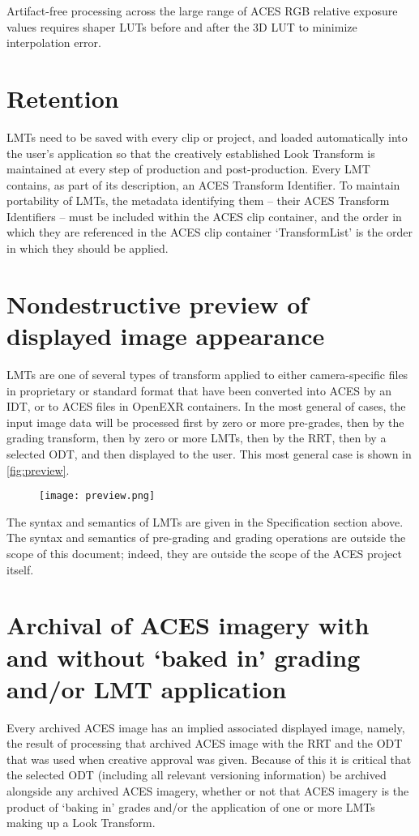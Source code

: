 Artifact-free processing across the large range of ACES RGB relative exposure values requires shaper LUTs before and after the 3D LUT to minimize interpolation error.

\section{Retention}
LMTs need to be saved with every clip or project, and loaded automatically into the user's application so that the creatively established Look Transform is maintained at every step of production and post-production. Every LMT contains, as part of its description, an ACES Transform Identifier. To maintain portability of LMTs, the metadata identifying them -- their ACES Transform Identifiers -- must be included within the ACES clip container, and the order in which they are referenced in the ACES clip container `TransformList' is the order in which they should be applied.

\section{Nondestructive preview of displayed image appearance}
LMTs are one of several types of transform applied to either camera-specific files in proprietary or standard format that have been converted into ACES by an IDT, or to ACES files in OpenEXR containers. In the most general of cases, the input image data will be processed first by zero or more pre-grades, then by the grading transform, then by zero or more LMTs, then by the RRT, then by a selected ODT, and then displayed to the user. This most general case is shown in \autoref{fig:preview}.

\begin{figure}[htb]
\begin{center}
    \texttt{[image: preview.png]}
\caption{}
\label{fig:preview}
\end{center}
\end{figure}

The syntax and semantics of LMTs are given in the Specification section above. The syntax and semantics of pre-grading and grading operations are outside the scope of this document; indeed, they are outside the scope of the ACES project itself.

\section{Archival of ACES imagery with and without ‘baked in’ grading and/or LMT application}
Every archived ACES image has an implied associated displayed image, namely, the result of processing that archived ACES image with the RRT and the ODT that was used when creative approval was given. Because of this it is critical that the selected ODT (including all relevant versioning information) be archived alongside any archived ACES imagery, whether or not that ACES imagery is the product of `baking in' grades and/or the application of one or more LMTs making up a Look Transform.

